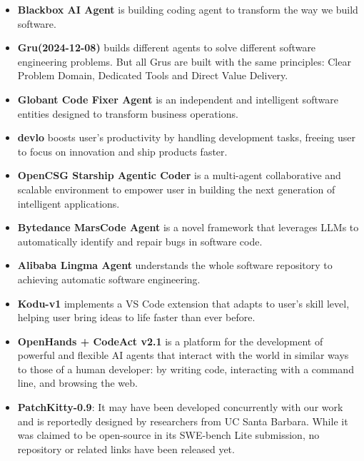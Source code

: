 \begin{itemize}

\item \textbf{Blackbox AI Agent} \cite{blackbox} is building coding agent to transform the way we build software.

\item \textbf{Gru(2024-12-08)} \cite{gru} builds different agents to solve different software engineering problems. But all Grus are built with the same principles: Clear Problem Domain, Dedicated Tools and Direct Value Delivery.

\item \textbf{Globant Code Fixer Agent} \cite{globant} is an independent and intelligent software entities designed to transform business operations.

\item \textbf{devlo} \cite{devlo} boosts user's productivity by handling development tasks, freeing user to focus on innovation and ship products faster.

\item \textbf{OpenCSG Starship Agentic Coder} \cite{opencsgstarship} is a multi-agent collaborative and scalable environment to empower user in building the next generation of intelligent applications.

\item \textbf{Bytedance MarsCode Agent} \cite{marscode} is a novel framework that leverages LLMs to automatically identify and repair bugs in software code.

\item \textbf{Alibaba Lingma Agent} \cite{repounderstander} understands the whole software repository to achieving automatic software engineering.

\item \textbf{Kodu-v1} \cite{kodu} implements a VS Code extension that adapts to user's skill level, helping user bring ideas to life faster than ever before. 

\item \textbf{OpenHands + CodeAct v2.1} \cite{wang2024openhands} is a platform for the development of powerful and flexible AI agents that interact with the world in similar ways to those of a human developer: by writing code, interacting with a command line, and browsing the web.

\item \textbf{PatchKitty-0.9}: It may have been developed concurrently with our work and is reportedly designed by researchers from UC Santa Barbara. While it was claimed to be open-source in its SWE-bench Lite submission, no repository or related links have been released yet.


\end{itemize}
